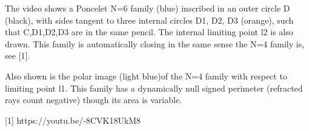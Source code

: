 The video shows a Poncelet N=6 family (blue) inscribed in an outer circle D  (black), with sides tangent to three internal circles D1, D2, D3 (orange), such that C,D1,D2,D3 are in the same pencil. The internal limiting point l2 is also drawn.  This family is automatically closing in the same sense the N=4 family is, see [1].

Also shown is the polar image (light blue)of the N=4 family with respect to limiting point l1. This family has a dynamically null signed perimeter (refracted rays count negative) though its area is variable.

[1] https://youtu.be/-8CVK18UkM8